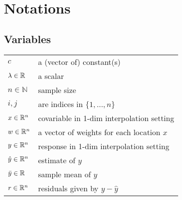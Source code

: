 \chapter*{Notations}
\label{c:Notation}

\section*{Variables}

\renewcommand{\arraystretch}{1.3} %
\begin{tabular}{l l}
$c$		& a (vector of) constant(s)\\
$\lambda \in \mathbb{R}$		& a scalar\\
$n\in \mathbb{N}$		& sample size\\
$i,j$		& are indices in $\{1,\dots,n\}$\\
$x\in \mathbb{R}^n$		& covariable in 1-dim interpolation setting\\
$w \in \mathbb{R}^n$		& a vector of weights for each location $x$\\
$y\in \mathbb{R}^n$		& response in 1-dim interpolation setting\\
$\hat y\in \mathbb{R}^n$		& estimate of $y$\\
$\bar y\in \mathbb{R}$		& sample mean of $y$\\
$r \in \mathbb{R}^n$		& residuals given by $y - \hat y$
\end{tabular}

